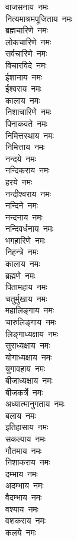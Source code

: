 \begin{multicols}{2}
\begin{flushleft}
वाजसनाय~नमः\\
नित्यमाश्रमपूजिताय~नमः\\
ब्रह्मचारिणे~नमः\\
लोकचारिणे~नमः\\
सर्वचारिणे~नमः\\
विचारविदे~नमः\\
ईशानाय~नमः\\
ईश्वराय~नमः\\
कालाय~नमः\hfill{}\\
निशाचारिणे~नमः\\
पिनाकवते~नमः\\
निमित्तस्थाय~नमः\\
निमित्ताय~नमः\\
नन्दये~नमः\\
नन्दिकराय~नमः\\
हरये~नमः\\
नन्दीश्वराय~नमः\\
नन्दिने~नमः\\
नन्दनाय~नमः\hfill{}\\
नन्दिवर्धनाय~नमः\\
भगहारिणे~नमः\\
निहन्त्रे~नमः\\
कालाय~नमः\\
ब्रह्मणे~नमः\\
पितामहाय~नमः\\
चतुर्मुखाय~नमः\\
महालिङ्गाय~नमः\\
चारुलिङ्गाय~नमः\\
लिङ्गाध्यक्षाय~नमः\hfill{}\\
सुराध्यक्षाय~नमः\\
योगाध्यक्षाय~नमः\\
युगावहाय~नमः\\
बीजाध्यक्षाय~नमः\\
बीजकर्त्रे~नमः\\
अध्यात्मानुगताय~नमः\\
बलाय~नमः\\
इतिहासाय~नमः\\
सकल्पाय~नमः\\
गौतमाय~नमः\hfill{}\\
निशाकराय~नमः\\
दम्भाय~नमः\\
अदम्भाय~नमः\\
वैदम्भाय~नमः\\
वश्याय~नमः\\
वशकराय~नमः\\
कलये~नमः\\

\end{flushleft}
\end{multicols}
